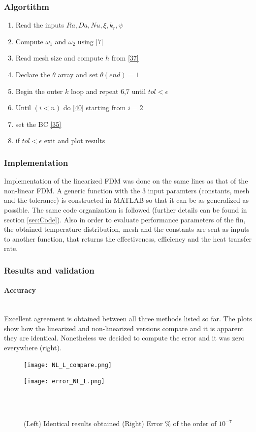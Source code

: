 \documentclass[12pt]{article}
\newcommand{\subsubsubsection}[1]{\paragraph{#1}\mbox{}\\}
\begin{document}
\subsubsection{Algortithm}
\begin{enumerate}
    \item Read the inputs $Ra, Da, Nu, \xi, k_r, \psi$
    \item Compute $\omega_1$ and $\omega_2$ using \eqref{7}
    \item Read mesh size and compute $h$ from \eqref{37}
    \item Declare the $\theta$ array and set $\theta(end)=1$
    \item Begin the outer $k$ loop and repeat 6,7 until $tol<\epsilon$
    \item Until $(i<n)$ do \eqref{40} starting from $i=2$
    \item set the BC \eqref{35} 
    \item if $tol<\epsilon$ exit and plot results
\end{enumerate}
\subsubsection{Implementation}
Implementation of the linearized FDM was done on the same lines as that of the non-linear FDM. A generic function with the 3 input paramters (constants, mesh and the tolerance) is constructed in MATLAB so that it can be as generalized as possible. The same code organization is followed (further details can be found in section \ref{sec:Code}). Also in order to evaluate performance parameters of the fin, the obtained temperature distribution, mesh and the constants are sent as inputs to another function, that returns the effectiveness, efficiency and the heat transfer rate. 
\subsubsection{Results and validation}
\subsubsubsection{Accuracy}
Excellent agreement is obtained between all three methods listed so far. The plots show how the linearized and non-linearized versions compare and it is apparent they are identical. Nonetheless we decided to compute the error and it was zero everywhere (right).

\begin{figure}[H]
\begin{minipage}{.5\textwidth}
    \hspace{-0.2cm}
    \vspace{-1.4cm}
  \texttt{[image: NL\_L\_compare.png]}
  \label{fig:22}
\end{minipage}%
\begin{minipage}{.5\textwidth}
  \hspace{0.0cm}
  \vspace{-1.4cm}
  \texttt{[image: error\_NL\_L.png]}
  \label{fig:23}
\end{minipage}
\\ \\
\caption{(Left) Identical results obtained (Right) Error \% of the order of $10^{-7}$}
\end{figure}
\end{document}
